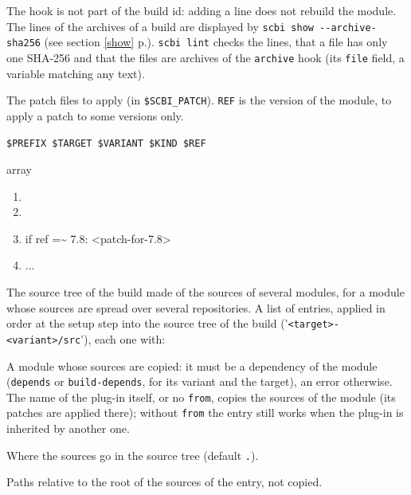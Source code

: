 \documentclass[a4paper,12pt,twoside]{article}
\newcommand{\code}[1]{\texttt{#1}}
\newcommand{\seeref}[1]{see section \ref{#1} p.\pageref{#1}}
\newcommand{\file}[1]{'{\texttt{#1}}'}
\newcommand{\ddash}{-{}-}
\begin{document}
\begin{description}[font=\large\texttt]
	The hook is not part of the build id: adding a line does not rebuild the module. The lines of the archives of a build are displayed by \code{scbi show \ddash{}archive-sha256} (\seeref{show}). \code{scbi lint} checks the lines, that a file has only one SHA-256 and that the files are archives of the \code{archive} hook (its \code{file} field, a variable matching any text).

	\item[patches {[}common|<variant>{]}] The patch files to apply (in \code{\$SCBI\_PATCH}). \code{REF} is the version of the module, to apply a patch to some versions only.

	\begin{description}[font=\textit,style=standard]
		\item[parameter] \tabto{2cm} \code{\$PREFIX \$TARGET \$VARIANT \$KIND \$REF}
		\item[return] \tabto{2cm} array
		\begin{enumerate}
			\item <patch-file-1>
			\item <patch-file-2>
			\item if ref =\textasciitilde{} 7.8: <patch-for-7.8>
			\item ...
		\end{enumerate}
	\end{description}

	\item[source-tree {[}<variant>{]}] \label{source-tree}The source
	tree of the build made of the sources of several modules, for a module
	whose sources are spread over several repositories. A list of entries,
	applied in order at the setup step into the source tree of the build
	(\file{<target>-<variant>/src}), each one with:

	\begin{description}[font=\texttt]
		\item[from] A module whose sources are copied: it must be a
		dependency of the module (\code{depends} or \code{build-depends},
		for its variant and the target), an error otherwise. The name of
		the plug-in itself, or no \code{from}, copies the sources of the
		module (its patches are applied there); without \code{from} the
		entry still works when the plug-in is inherited by another one.
		\item[to] Where the sources go in the source tree (default \code{.}).
		\item[exclude] Paths relative to the root of the sources of the
		entry, not copied.
	\end{description}


\end{description}
\end{document}
